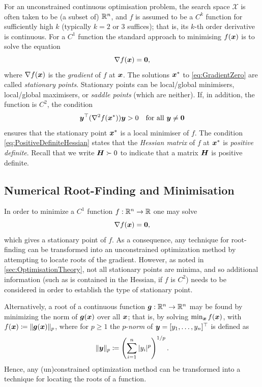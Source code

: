 For an unconstrained continuous optimisation problem, the search space \(\mathcal{X}\) is often taken to be (a subset of) \(\mathbb{R}^n\), and \(f\) is assumed to be a \(C^k\) function for sufficiently high \(k\) (typically \(k=2\) or \(3\) suffices); that is, its \(k\)-th order derivative is continuous. For a \(C^1\) function the standard approach to minimising \(f(\boldsymbol{x})\) is to solve the equation
\begin{equation}
	\nabla f(\boldsymbol{x}) = \boldsymbol{0}, \label{eq:GradientZero}
\end{equation}
where \(\nabla f(\boldsymbol{x})\) is the \textit{gradient} of \(f\) at \(\boldsymbol{x}\). The solutions \(\boldsymbol{x}^*\) to \cref{eq:GradientZero} are called \textit{stationary points}. Stationary points can be local/global minimisers, local/global maximisers, or \textit{saddle points} (which are neither). If, in addition, the function is \(C^2\), the condition
\begin{equation}
	\boldsymbol{y}^\top (\nabla^2 f(\boldsymbol{x}^*)) \boldsymbol{y} > 0 \quad \text{for all } \boldsymbol{y} \neq \boldsymbol{0} \label{eq:PositiveDefiniteHessian}
\end{equation}
ensures that the stationary point \(\boldsymbol{x}^*\) is a local minimiser of \(f\). The condition \cref{eq:PositiveDefiniteHessian} states that the \textit{Hessian matrix} of \(f\) at \(\boldsymbol{x}^*\) is \textit{positive definite}. Recall that we write \(\boldsymbol{H} \succ 0\) to indicate that a matrix \(\boldsymbol{H}\) is positive definite.

\subsection{Numerical Root-Finding and Minimisation}
In order to minimize a \(C^1\) function \(f : \mathbb{R}^n \to \mathbb{R}\) one may solve
\begin{equation*}
	\nabla f(\boldsymbol{x}) = \boldsymbol{0},
\end{equation*}
which gives a stationary point of \(f\). As a consequence, any technique for root-finding can be transformed into an unconstrained optimization method by attempting to locate roots of the gradient. However, as noted in \cref{sec:OptimisationTheory}, not all stationary points are minima, and so additional information (such as is contained in the Hessian, if \(f\) is \(C^2\)) needs to be considered in order to establish the type of stationary point.

Alternatively, a root of a continuous function \(\boldsymbol{g} : \mathbb{R}^n \to \mathbb{R}^n\) may be found by minimizing the norm of \(\boldsymbol{g}(\boldsymbol{x})\) over all \(\boldsymbol{x}\); that is, by solving \(\min_{\boldsymbol{x}} f(\boldsymbol{x})\), with \(f(\boldsymbol{x}) \coloneqq \|\boldsymbol{g}(\boldsymbol{x})\|_p\), where for \(p \ge 1\) the \(p\)-\textit{norm} of \(\boldsymbol{y} = [y_1, \dots, y_n]^\top\) is defined as
\begin{equation*}
	\|\boldsymbol{y}\|_p \coloneqq \left( \sum_{i=1}^n |y_i|^p \right)^{1/p}.
\end{equation*}
Hence, any (un)constrained optimization method can be transformed into a technique for locating the roots of a function.

